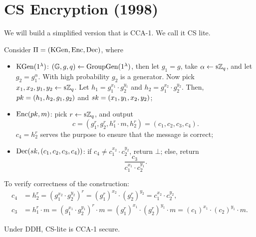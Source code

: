 \section{\acl{CS} Encryption (1998)}

We will build a simplified version that is \ac{CCA}-1.
We call it \ac{CS} lite.

\begin{construction}
	Consider $\Pi = (\mathrm{KGen}, \mathrm{Enc}, \mathrm{Dec})$, where
	\begin{itemize}
		\item $\mathrm{KGen}(1^{\lambda})$:
			$(\mathbb{G} , \allowbreak g , \allowbreak q) \leftarrow \mathrm{GroupGen}(1^{\lambda})$, then let $g_1 = g$, take $\alpha \leftarrow {\scriptstyle \$} {\mathbb{Z}_q}$, and let $g_2 = g_1^{\alpha}$.
			With high probability $g_2$ is a generator.
			Now pick $x_1, x_2, y_1, y_2 \leftarrow {\scriptstyle \$} {\mathbb{Z}_q}$.
			Let $h_1 = g_1^{x_1} \cdot g_2^{y_1}$ and $h_2 = g_1^{x_2} \cdot g_2^{y_2}$.
			Then, $pk = (h_1, h_2, g_1, g_2)$ and $sk = (x_1, y_1, x_2, y_2)$;
		\item $\mathrm{Enc}(pk, m)$:
			pick $r \leftarrow {\scriptstyle \$} {\mathbb{Z}_q}$, and output
			\begin{equation*}
				c = (g_1^r, g_2^r, h_1^r \cdot m, h_2^r) = (c_1, c_2, c_3, c_4).
			\end{equation*}
			$c_4 = h_2^r$ serves the purpose to ensure that the message is correct;
		\item $\mathrm{Dec}(sk, (c_1, c_2, c_3, c_4))$:
			if $c_4 \neq c_1^{x_2} \cdot c_2^{y_2}$, return $\bot$;
			else, return
			\begin{equation*}
				\frac{c_3}{c_1^{x_1} \cdot c_2^{y_1}}.
			\end{equation*}
	\end{itemize}
	To verify correctness of the construction:
	\begin{align*}
		c_4 & =
		h_2^r =
		{(g_1^{x_2} \cdot g_2^{y_2})}^r =
		{(g_1^r)}^{x_2} \cdot {(g_2^r)}^{y_2} =
		c_1^{x_2} \cdot c_2^{y_2}, \\
		c_3 & =
		h_1^r \cdot m =
		(g_1^{x_1} \cdot g_2^{y_1})^{r} \cdot m =
		(g_1^r)^{x_1} \cdot (g_2^r)^{y_1} \cdot m =
		(c_1)^{x_1} \cdot (c_2)^{y_1} \cdot m.
	\end{align*}
\end{construction}

\begin{theorem} \label{thm:cs-lite-cca-1}
	Under \ac{DDH}, \ac{CS}-lite is \ac{CCA}-1 secure.
\end{theorem}

